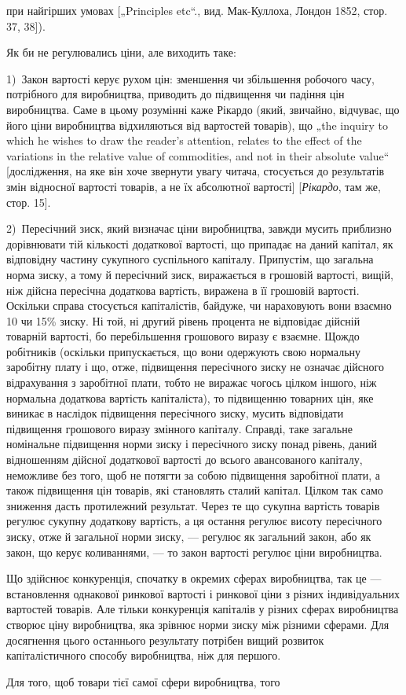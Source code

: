\parcont{}  %
при найгірших умовах [„Principles etc“., вид. Мак-Куллоха, Лондон
1852, стор. 37, 38]).

Як би не регулювались ціни, але виходить таке:

1)~Закон вартості керує рухом цін: зменшення чи збільшення
робочого часу, потрібного для виробництва, приводить до підвищення
чи падіння цін виробництва. Саме в цьому розумінні
каже Рікардо (який, звичайно, відчуває, що його ціни виробництва
відхиляються від вартостей товарів), що „the inquiry to
which he wishes to draw the reader’s attention, relates to the effect
of the variations in the relative value of commodities, and not in
their absolute value“ [дослідження, на яке він хоче звернути увагу
читача, стосується до результатів змін відносної вартості товарів,
а не їх абсолютної вартості] [\emph{Рікардо}, там же, стор. 15].

2)~Пересічний зиск, який визначає ціни виробництва, завжди
мусить приблизно дорівнювати тій кількості додаткової вартості,
що припадає на даний капітал, як відповідну частину сукупного
суспільного капіталу. Припустім, що загальна норма
зиску, а тому й пересічний зиск, виражається в грошовій вартості,
вищій, ніж дійсна пересічна додаткова вартість, виражена в її
грошовій вартості. Оскільки справа стосується капіталістів, байдуже,
чи нараховують вони взаємно 10 чи 15\% зиску. Ні той,
ні другий рівень процента не відповідає дійсній товарній вартості,
бо перебільшення грошового виразу є взаємне. Щождо
робітників (оскільки припускається, що вони одержують свою
нормальну заробітну плату і що, отже, підвищення пересічного
зиску не означає дійсного відрахування з заробітної плати,
тобто не виражає чогось цілком іншого, ніж нормальна додаткова
вартість капіталіста), то підвищенню товарних цін, яке
виникає в наслідок підвищення пересічного зиску, мусить відповідати
підвищення грошового виразу змінного капіталу. Справді,
таке загальне номінальне підвищення норми зиску і пересічного
зиску понад рівень, даний відношенням дійсної додаткової
вартості до всього авансованого капіталу, неможливе без того,
щоб не потягти за собою підвищення заробітної плати, а також
підвищення цін товарів, які становлять сталий капітал. Цілком
так само зниження дасть протилежний результат. Через те що
сукупна вартість товарів регулює сукупну додаткову вартість,
а ця остання регулює висоту пересічного зиску, отже й загальної
норми зиску, — регулює як загальний закон, або як закон, що
керує коливаннями, — то закон вартості регулює ціни виробництва.

Що здійснює конкуренція, спочатку в окремих сферах виробництва,
так це — встановлення однакової ринкової вартості
і ринкової ціни з різних індивідуальних вартостей товарів. Але
тільки конкуренція капіталів у різних сферах виробництва створює
ціну виробництва, яка зрівнює норми зиску між різними сферами.
Для досягнення цього останнього результату потрібен вищий
розвиток капіталістичного способу виробництва, ніж для першого.

Для того, щоб товари тієї самої сфери виробництва, того
\parbreak{}  %
